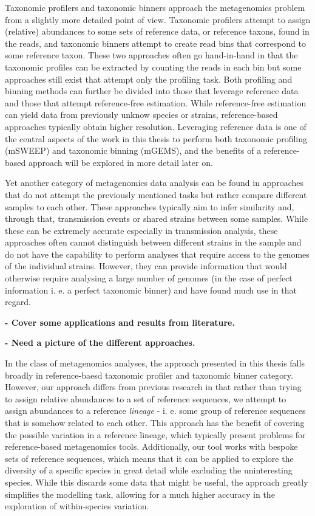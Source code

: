 \documentclass[officiallayout]{tktla}
\begin{document}
Taxonomic profilers and taxonomic binners approach the metagenomics
problem from a slightly more detailed point of view. Taxonomic
profilers attempt to assign (relative) abundances to some sets of
reference data, or reference taxons, found in the reads, and taxonomic
binners attempt to create read bins that correspond to some reference
taxon. These two approaches often go hand-in-hand in that the
taxonomic profiles can be extracted by counting the reads in each bin
but some approaches still exist that attempt only the profiling
task. Both profiling and binning methods can further be divided into
those that leverage reference data and those that attempt
reference-free estimation. While reference-free estimation can yield
data from previously unknow species or strains, reference-based
approaches typically obtain higher resolution. Leveraging reference
data is one of the central aspects of the work in this thesis to
perform both taxonomic profiling (mSWEEP) and taxonomic binning
(mGEMS), and the benefits of a reference-based approach will be
explored in more detail later on.

Yet another category of metagenomics data analysis can be found in
approaches that do not attempt the previously mentioned tasks but
rather compare different samples to each other. These approaches
typically aim to infer similarity and, through that, transmission
events or shared strains between some samples. While these can be
extremely accurate especially in transmission analysis, these
approaches often cannot distinguish between different strains in the
sample and do not have the capability to perform analyses that require
access to the genomes of the individual strains. However, they can
provide information that would otherwise require analysing a large
number of genomes (in the case of perfect information i. e. a perfect
taxonomic binner) and have found much use in that regard.

\textbf{- Cover some applications and results from literature.}

\textbf{- Need a picture of the different approaches.}

In the class of metagenomics analyses, the approach presented in this
thesis falls broadly in reference-baesd taxonomic profiler and
taxonomic binner category. However, our approach differs from previous
research in that rather than trying to assign relative abundances to a
set of reference sequences, we attempt to assign abundances to a
reference \textit{lineage} - i. e. some group of reference sequences
that is somehow related to each other. This approach has the benefit
of covering the possible variation in a reference lineage, which
typically present problems for reference-based metagenomics
tools. Additionally, our tool works with bespoke sets of reference
sequences, which means that it can be applied to explore the diversity
of a specific species in great detail while excluding the
uninteresting species. While this discards some data that might be
useful, the approach greatly simplifies the modelling task, allowing
for a much higher accuracy in the exploration of within-species
variation.
\end{document}
